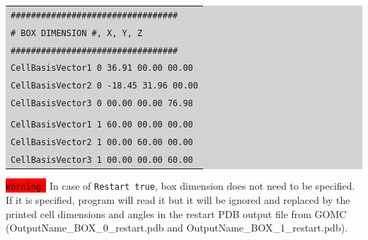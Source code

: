 \begin{description}
	\colorbox{lightgray}{
	\begin{tabular}{l}
	\texttt{\#\#\#\#\#\#\#\#\#\#\#\#\#\#\#\#\#\#\#\#\#\#\#\#\#\#\#\#\#\#\#\#\#}\\
	\texttt{\#  BOX DIMENSION \#, X, Y, Z}\\
	\texttt{\#\#\#\#\#\#\#\#\#\#\#\#\#\#\#\#\#\#\#\#\#\#\#\#\#\#\#\#\#\#\#\#\#}\\
	\texttt{CellBasisVector1 0  36.91  00.00  00.00}\\
	\texttt{CellBasisVector2 0   -18.45 31.96   00.00}\\
	\texttt{CellBasisVector3 0   00.00 00.00  76.98}\\\\
	\texttt{CellBasisVector1 1  60.00 00.00 00.00}\\
	\texttt{CellBasisVector2 1    00.00 60.00  00.00}\\
	\texttt{CellBasisVector3 1    00.00 00.00  60.00}\\
	\end{tabular}}
	
	\colorbox{red}{\texttt{Warning:}} In case of \texttt{Restart   true}, box dimension does not need to be specified. If it is specified, program will read it but it will be ignored and replaced by the printed cell dimensions and angles in the restart PDB output file from GOMC (OutputName\_BOX\_0\_restart.pdb and OutputName\_BOX\_1\_restart.pdb). \\
	

\end{description}
